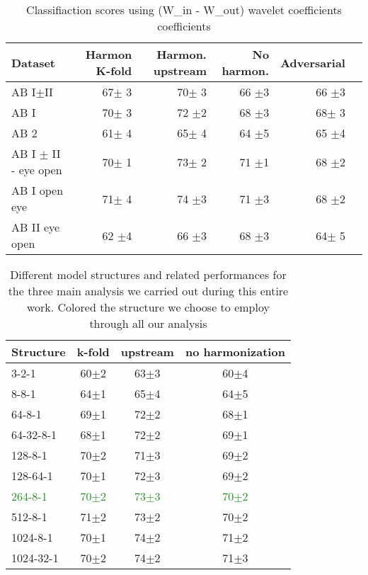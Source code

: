 \documentclass[11pt]{report}
\begin{document}
\begin{table}[!htp]\centering
\scriptsize
\begin{tabular}{lrrrrr}\toprule
Dataset &Harmon K-fold &Harmon. upstream &No harmon. &Adversarial \\\midrule
AB I$\pm$II &67$\pm$ 3 &70$\pm$ 3 &66 $\pm$3 &66 $\pm$3 \\
AB I &70$\pm$ 3 &72 $\pm$2 &68 $\pm$3 &68$\pm$ 3 \\
AB 2 &61$\pm$ 4 &65$\pm$ 4 &64 $\pm$5 &65 $\pm$4 \\
AB I $\pm$ II - eye open &70$\pm$ 1 &73$\pm$ 2 &71 $\pm$1 &68 $\pm$2 \\
AB I open eye &71$\pm$ 4 &74 $\pm$3 &71 $\pm$3 &68 $\pm$2 \\
AB II eye open &62 $\pm$4 &66 $\pm$3 &68 $\pm$3 &64$\pm$ 5 \\
\bottomrule
\end{tabular}
\caption{Classifiaction scores using (W\_in - W\_out) wavelet coefficients coefficients}
\label{tab:classification_win-wout}
\end{table}





\begin{table}[!htp]\centering
\begin{tabular}{lccc}
\toprule
Structure &k-fold &upstream &no harmonization \\
\midrule
3-2-1 &60$\pm$2 &63$\pm$3 &60$\pm$4 \\
8-8-1 &64$\pm$1 &65$\pm$4 &64$\pm$5 \\
64-8-1 &69$\pm$1 &72$\pm$2 &68$\pm$1 \\
64-32-8-1 &68$\pm$1 &72$\pm$2 &69$\pm$1 \\
128-8-1 &70$\pm$2 &71$\pm$3 &69$\pm$2 \\
128-64-1 &70$\pm$1 &72$\pm$3 &69$\pm$2 \\
\textcolor{ForestGreen}{264-8-1}&\textcolor{ForestGreen}{70$\pm$2} & \textcolor{ForestGreen}{73$\pm$3} & \textcolor{ForestGreen}{70$\pm$2} \\
512-8-1 &71$\pm$2 &73$\pm$2 &70$\pm$2 \\
1024-8-1 &70$\pm$1 &74$\pm$2 &71$\pm$2 \\
1024-32-1 &70$\pm$2 &74$\pm$2 &71$\pm$3 \\
\bottomrule
\end{tabular}
\caption{Different model structures and related performances for the three main analysis we carried out during this entire work. Colored the structure we choose to employ through all our analysis}\label{tab:different_model_structures}
\end{table}
\end{document}
